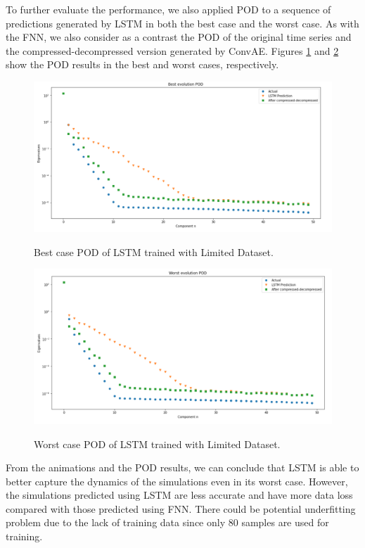 To further evaluate the performance, we also applied POD to a sequence of predictions generated by LSTM in both the best case and the worst case. As with the FNN, we also consider as a contrast the POD of the original time series and the compressed-decompressed version generated by ConvAE. Figures \ref{figure:LSTM_limited_best_POD} and \ref{figure:LSTM_limited_worst_POD} show the POD results in the best and  worst cases, respectively.

\begin{figure}[H]
    \caption{Best case POD of LSTM trained with Limited Dataset.}
    \includegraphics[scale=0.5]{figures/mantle_convection_images/limited_dataset/LSTM_Best_POD.png}
    \label{figure:LSTM_limited_best_POD}
\end{figure}

\begin{figure}[H]
    \caption{Worst case POD of LSTM trained with Limited Dataset.}
    \includegraphics[scale=0.5]{figures/mantle_convection_images/limited_dataset/LSTM_Worst_POD.png}
    \label{figure:LSTM_limited_worst_POD}
\end{figure}

From the animations and the POD results, we can conclude that LSTM is able to better capture the dynamics of the simulations even in its worst case. However, the simulations predicted using LSTM are less accurate and have more data loss compared with those predicted using FNN. There could be potential underfitting problem due to the lack of training data since only 80 samples are used for training.


